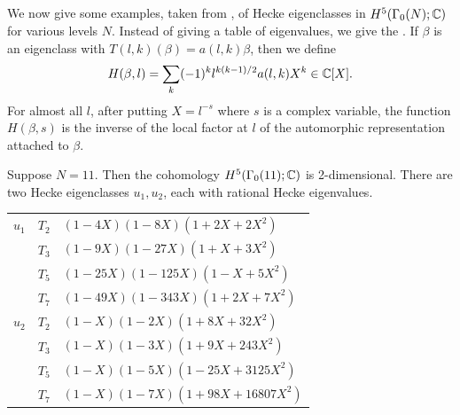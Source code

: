 \subsection{}
%
We now give some examples, taken from \cite{computation}, of Hecke
eigenclasses in $H^{5} (\Gamma_{0} (N); \mathbb{C})$ for various levels
$N$.
Instead of giving a table of eigenvalues, we give the .  If $\beta$ is an eigenclass with $T (l,k) (\beta) = a
(l,k)\beta$, then we define
\[
H (\beta , l) = \sum_k (-1)^k l^{k(k-1)/2} a(l, k) X^k \in \mathbb{C} [X].
\]
For almost all $l$, after putting $X = l^{-s}$ where $s$ is a complex
variable, the function $H
(\beta , s)$ is the inverse of the local factor at $l$ of the
automorphic representation attached to $\beta$.
\begin{example}
Suppose $N=11$.  Then the cohomology $H^{5} (\Gamma_{0} (11); \mathbb{C})$ is
2-dimensional.  There are two Hecke eigenclasses $u_{1}, u_{2}$, each
with rational Hecke eigenvalues.

\medskip
\begin{center}
\begin{tabular}{|p{40pt}|p{40pt}|p{200pt}|}
\hline
$u_{1}$&$T_2$&$ (1-4 X)(1-8 X)(1 +2 X + 2 X^2)$\\
&$T_3$&$ (1-9 X)(1-27 X)(1 + X + 3 X^2) $\\
&$T_5$&$ (1-25 X)(1-125 X)(1 - X + 5 X^2) $\\
&$T_7$&$ (1-49 X)(1-343 X)(1 +2 X + 7 X^2) $\\
\hline
$u_{2}$&$T_2$&$ (1- X)(1-2 X)(1 +8 X + 32 X^2)$\\
&$T_3$&$ (1- X)(1-3 X)(1 +9 X + 243 X^2) $\\
&$T_5$&$ (1- X)(1-5 X)(1 -25 X + 3125 X^2) $\\
&$T_7$&$ (1- X)(1-7 X)(1 +98 X + 16807 X^2) $\\
\hline
\end{tabular}
\end{center}

  
\end{example}
 
